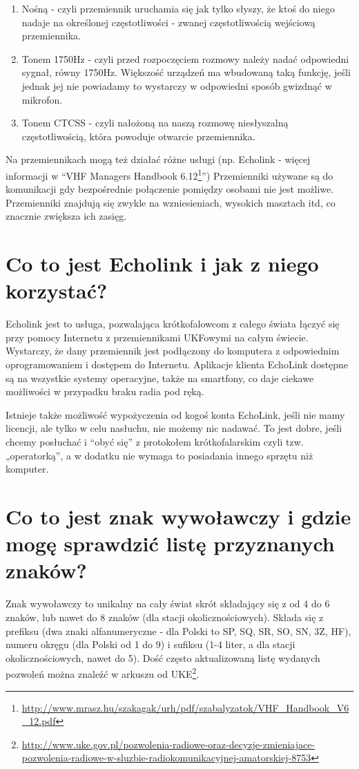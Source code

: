 \documentclass[a4paper,12pt]{article}
\begin{document}
\begin{enumerate}
 \item Nośną - czyli przemiennik uruchamia się jak tylko słyszy, że ktoś do niego nadaje na określonej częstotliwości - zwanej częstotliwością wejściową przemiennika.
 \item Tonem 1750Hz - czyli przed rozpoczęciem rozmowy należy nadać odpowiedni sygnał, równy 1750Hz. Większość urządzeń ma wbudowaną taką funkcję, jeśli jednak jej nie powiadamy to wystarczy w odpowiedni sposób gwizdnąć w mikrofon.
 \item Tonem CTCSS - czyli nałożoną na naszą rozmowę niesłyszalną częstotliwością, która powoduje otwarcie przemiennika.
\end{enumerate}


Na przemiennikach mogą też działać różne usługi (np. Echolink - więcej informacji w “VHF Managers Handbook 6.12\footnote{\url{http://www.mrasz.hu/szakagak/urh/pdf/szabalyzatok/VHF\_Handbook\_V6\_12.pdf}}”)  Przemienniki używane są do komunikacji gdy bezpośrednie połączenie pomiędzy osobami nie jest możliwe. Przemienniki znajdują się zwykle na wzniesieniach, wysokich masztach itd, co znacznie zwiększa ich zasięg.

\section{Co to jest Echolink i jak z niego korzystać?}
Echolink jest to usługa, pozwalająca krótkofalowcom z całego świata łączyć się przy pomocy Internetu z przemiennikami UKFowymi na całym świecie. Wystarczy, że dany przemiennik jest podłączony do komputera z odpowiednim oprogramowaniem i dostępem do Internetu.
Aplikacje klienta EchoLink dostępne są na wszystkie systemy operacyjne, także na smartfony, co daje ciekawe możliwości w przypadku braku radia pod ręką.

Istnieje także możliwość wypożyczenia od kogoś konta EchoLink, jeśli nie mamy licencji, ale tylko w celu nasłuchu, nie możemy nic nadawać. To jest dobre, jeśli chcemy posłuchać i “obyć się” z protokołem krótkofalarskim czyli tzw. „operatorką”, a w dodatku nie wymaga to posiadania innego sprzętu niż komputer.

\section{Co to jest znak wywoławczy i gdzie mogę sprawdzić listę przyznanych znaków?}
Znak wywoławczy to unikalny na cały świat skrót składający się z od 4 do 6 znaków, lub nawet do 8 znaków (dla stacji okolicznościowych). Składa się z prefiksu (dwa znaki alfanumeryczne - dla Polski to SP, SQ, SR, SO, SN, 3Z, HF), numeru okręgu (dla Polski od 1 do 9) i sufiksu (1-4 liter, a dla stacji okolicznościowych, nawet do 5).
Dość często aktualizowaną listę wydanych pozwoleń można znaleźć w arkuszu od UKE\footnote{\url{http://www.uke.gov.pl/pozwolenia-radiowe-oraz-decyzje-zmieniajace-pozwolenia-radiowe-w-sluzbie-radiokomunikacyjnej-amatorskiej-8753}}.
\end{document}

